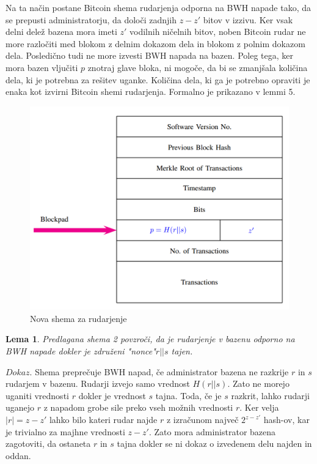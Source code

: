\documentclass[12pt]{article}
\newtheorem{lema}{Lema}
\begin{document}
Na ta način postane Bitcoin shema rudarjenja odporna na BWH napade tako, da se prepusti administratorju, da določi zadnjih \textit{$z - z'$} bitov v izzivu. Ker vsak delni delež bazena mora imeti \textit{$z'$} vodilnih ničelnih bitov, noben Bitcoin rudar ne more razločiti med blokom z delnim dokazom dela in blokom z polnim dokazom dela. Posledično tudi ne more izvesti BWH napada na bazen. Poleg tega, ker mora bazen vljučiti \textit{$p$} znotraj glave bloka, ni mogoče, da bi se zmanjšala količina dela, ki je potrebna za rešitev uganke. Količina dela, ki ga je potrebno opraviti je enaka kot izvirni Bitcoin shemi rudarjenja. Formalno je prikazano v lemmi 5.

\begin{figure}
  \includegraphics[scale=0.45]{image10.png}
  \caption{Nova shema za rudarjenje}
  \label{fig:boat3}
\end{figure}

\begin{lema}\label{lema5}
	Predlagana shema 2 povzroči, da je rudarjenje v bazenu odporno na BWH napade dokler je združeni "nonce"\textit{$r||s$} tajen.
\end{lema}

\noindent\textit{$Dokaz$}. Shema preprečuje BWH napad, če administrator bazena ne razkrije \textit{$r$} in \textit{$s$} rudarjem v bazenu. Rudarji izvejo samo vrednost \textit{$H(r||s)$}. Zato ne morejo uganiti vrednosti \textit{$r$} dokler je vrednost \textit{$s$} tajna. Toda, če je \textit{$s$} razkrit, lahko rudarji uganejo \textit{$r$} z napadom grobe sile preko vseh možnih  vrednosti \textit{$r$}. Ker velja \textit{$|r| = z - z'$} lahko bilo kateri rudar najde \textit{$r$} z izračunom največ \textit{$2^{z-z'}$} hash-ov, kar je trivialno za majhne vrednosti \textit{$z - z'$}. Zato mora administrator bazena zagotoviti, da ostaneta \textit{$r$} in \textit{$s$} tajna dokler se ni dokaz o izvedenem delu najden in oddan.
\end{document}
